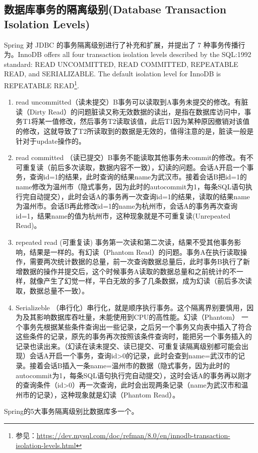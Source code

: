 \documentclass[../../../interview-questions.tex]{subfiles}
\begin{document}
\subsection{数据库事务的隔离级别(Database Transaction Isolation Levels)}

Spring 对 JDBC 的事务隔离级别进行了补充和扩展，并提出了 7 种事务传播行为。InnoDB offers all four transaction isolation levels described by the SQL:1992 standard: READ UNCOMMITTED, READ COMMITTED, REPEATABLE READ, and SERIALIZABLE. The default isolation level for InnoDB is REPEATABLE READ\footnote{参见：\url{https://dev.mysql.com/doc/refman/8.0/en/innodb-transaction-isolation-levels.html}}.

\begin{enumerate}
\item {read uncommitted（读未提交）B事务可以读取到A事务未提交的修改。有脏读（Dirty Read）的问题}脏读又称无效数据的读出，是指在数据库访问中，事务T1将某一值修改，然后事务T2读取该值，此后T1因为某种原因撤销对该值的修改，这就导致了T2所读取到的数据是无效的，值得注意的是，脏读一般是针对于update操作的。
\item{read committed （读已提交）B事务不能读取其他事务未commit的修改。有不可重复读（前后多次读取，数据内容不一致），幻读的问题。}会话A开启一个事务，查询id=1的结果，此时查询的结果name为武汉市。接着会话B把id=1的name修改为温州市（隐式事务，因为此时的autocommit为1，每条SQL语句执行完自动提交），此时会话A的事务再一次查询id=1的结果，读取的结果name为温州市。会话B再此修改id=1的name为杭州市，会话A的事务再次查询id=1，结果name的值为杭州市，这种现象就是不可重复读(Unrepeated Read)。
\item{repeated read (可重复读) 事务第一次读和第二次读，结果不受其他事务影响，结果是一样的。有幻读（Phantom Read）的问题。事务A在执行读取操作，需要两次统计数据的总量，前一次查询数据总量后，此时事务B执行了新增数据的操作并提交后，这个时候事务A读取的数据总量和之前统计的不一样，就像产生了幻觉一样，平白无故的多了几条数据，成为幻读（前后多次读取，数据总量不一致）。}
\item{Serializeble （串行化）串行化，就是顺序执行事务。这个隔离界别要慎用，因为及其影响数据库吞吐量，未能使用到CPU的高性能。}幻读（Phantom）
一个事务先根据某些条件查询出一些记录，之后另一个事务又向表中插入了符合这些条件的记录，原先的事务再次按照该条件查询时，能把另一个事务插入的记录也读出来。（幻读在读未提交、读已提交、可重复读隔离级别都可能会出现）会话A开启一个事务，查询id>0的记录，此时会查到name=武汉市的记录。接着会话B插入一条name=温州市的数据（隐式事务，因为此时的autocommit为1，每条SQL语句执行完自动提交），这时会话A的事务再以刚才的查询条件（id>0）再一次查询，此时会出现两条记录（name为武汉市和温州市的记录），这种现象就是幻读（Phantom Read）。
\end{enumerate}

Spring的5大事务隔离级别比数据库多一个。
\end{document}
